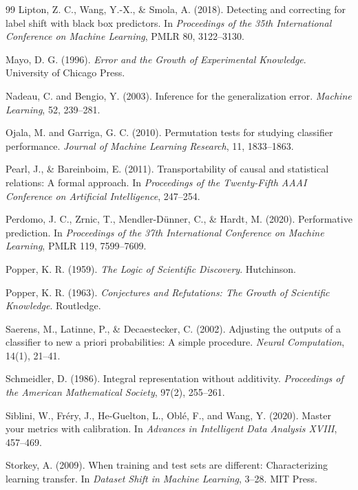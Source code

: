\documentclass[11pt]{article}
\theoremstyle{remark}
\begin{document}
\begin{thebibliography}{99}
Lipton, Z. C., Wang, Y.-X., \& Smola, A. (2018).
Detecting and correcting for label shift with black box predictors.
In \emph{Proceedings of the 35th International Conference on Machine Learning}, PMLR 80, 3122--3130.

Mayo, D. G. (1996).
\emph{Error and the Growth of Experimental Knowledge}.
University of Chicago Press.

Nadeau, C. and Bengio, Y. (2003).
Inference for the generalization error.
\emph{Machine Learning}, 52, 239--281.

Ojala, M. and Garriga, G. C. (2010).
Permutation tests for studying classifier performance.
\emph{Journal of Machine Learning Research}, 11, 1833--1863.

Pearl, J., \& Bareinboim, E. (2011).
Transportability of causal and statistical relations: A formal approach.
In \emph{Proceedings of the Twenty-Fifth AAAI Conference on Artificial Intelligence}, 247--254.

Perdomo, J. C., Zrnic, T., Mendler-D\"unner, C., \& Hardt, M. (2020).
Performative prediction.
In \emph{Proceedings of the 37th International Conference on Machine Learning}, PMLR 119, 7599--7609.

Popper, K. R. (1959).
\emph{The Logic of Scientific Discovery}.
Hutchinson.

Popper, K. R. (1963).
\emph{Conjectures and Refutations: The Growth of Scientific Knowledge}.
Routledge.

Saerens, M., Latinne, P., \& Decaestecker, C. (2002).
Adjusting the outputs of a classifier to new a priori probabilities: A simple procedure.
\emph{Neural Computation}, 14(1), 21--41.

Schmeidler, D. (1986).
Integral representation without additivity.
\emph{Proceedings of the American Mathematical Society}, 97(2), 255--261.

Siblini, W., Fr\'ery, J., He-Guelton, L., Obl\'e, F., and Wang, Y. (2020).
Master your metrics with calibration.
In \emph{Advances in Intelligent Data Analysis XVIII}, 457--469.

Storkey, A. (2009).
When training and test sets are different: Characterizing learning transfer.
In \emph{Dataset Shift in Machine Learning}, 3--28. MIT Press.


\end{thebibliography}
\end{document}
